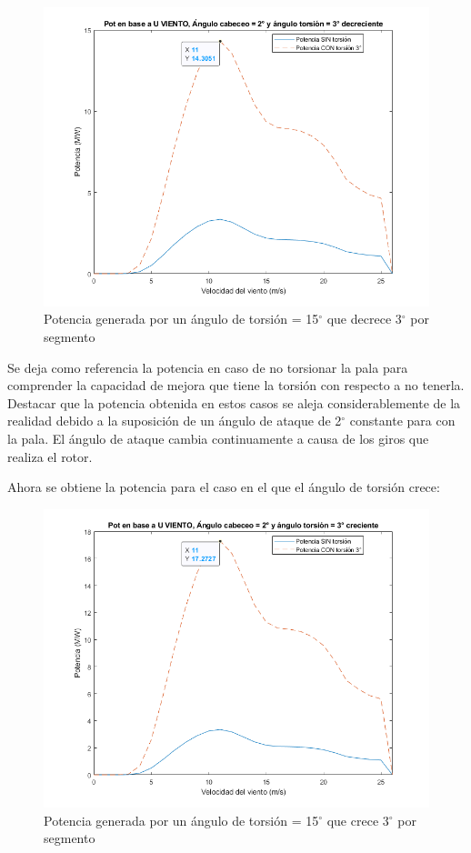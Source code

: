 \begin{figure}[H]
    \centering
    \includegraphics[width=1\textwidth]{images/torsion 3 decreciente.png}
    \caption{Potencia generada por un ángulo de torsión = 15$^{\circ}$ que decrece 3$^{\circ}$ por segmento}
     \label{fig:torsion_decrece3}
\end{figure}

Se deja como referencia la potencia en caso de no torsionar la pala para comprender la capacidad de mejora que tiene la torsión con respecto a no tenerla. Destacar que la potencia obtenida en estos casos se aleja considerablemente de la realidad debido a la suposición de un ángulo de ataque de 2$^{\circ}$ constante para con la pala. El ángulo de ataque cambia continuamente a causa de los giros que realiza el rotor.




Ahora se obtiene la potencia para el caso en el que el ángulo de torsión crece:
\begin{figure}[H]
    \centering
    \includegraphics[width=1\textwidth]{images/torsion 3 creciente.png}
    \caption{Potencia generada por un ángulo de torsión = 15$^{\circ}$ que crece 3$^{\circ}$ por segmento}
     \label{fig:torsion_crece3}
\end{figure}

